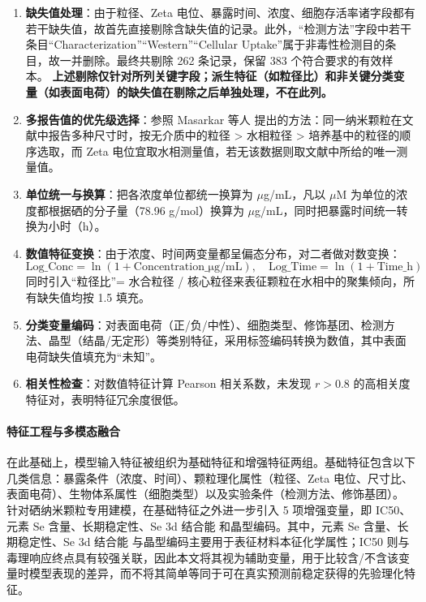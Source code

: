 \begin{enumerate}
  \item \textbf{缺失值处理}：由于粒径、Zeta 电位、暴露时间、浓度、细胞存活率诸字段都有若干缺失值，故首先直接剔除含缺失值的记录。此外，“检测方法”字段中若干条目“Characterization”“Western”“Cellular Uptake”属于非毒性检测目的条目，故一并删除。最终共剔除 262 条记录，保留 383 个符合要求的有效样本。
  \textbf{上述剔除仅针对所列关键字段；派生特征（如粒径比）和非关键分类变量（如表面电荷）的缺失值在剔除之后单独处理，不在此列。}

  \item \textbf{多报告值的优先级选择}：参照 Masarkar 等人 \cite{masarkar2024} 提出的方法：同一纳米颗粒在文献中报告多种尺寸时，按无介质中的粒径 > 水相粒径 > 培养基中的粒径的顺序选取，而 Zeta 电位宜取水相测量值，若无该数据则取文献中所给的唯一测量值。

  \item \textbf{单位统一与换算}：把各浓度单位都统一换算为 $\mu$g/mL，凡以 $\mu$M 为单位的浓度都根据硒的分子量（78.96 g/mol）换算为 $\mu$g/mL，同时把暴露时间统一转换为小时（h）。

  \item \textbf{数值特征变换}：由于浓度、时间两变量都呈偏态分布，对二者做对数变换：
        \[
          \text{Log\_Conc} = \ln(1 + \text{Concentration\_μg/mL}), \quad
          \text{Log\_Time} = \ln(1 + \text{Time\_h})
        \]
        同时引入“粒径比”= 水合粒径 / 核心粒径来表征颗粒在水相中的聚集倾向，所有缺失值均按 1.5 填充。

  \item \textbf{分类变量编码}：对表面电荷（正/负/中性）、细胞类型、修饰基团、检测方法、晶型（结晶/无定形）等类别特征，采用标签编码转换为数值，其中表面电荷缺失值填充为“未知”。

  \item \textbf{相关性检查}：对数值特征计算 Pearson 相关系数，未发现 $r > 0.8$ 的高相关度特征对，表明特征冗余度很低。
\end{enumerate}

\paragraph{特征工程与多模态融合}

在此基础上，模型输入特征被组织为基础特征和增强特征两组。基础特征包含以下几类信息：暴露条件（浓度、时间）、颗粒理化属性（粒径、Zeta 电位、尺寸比、表面电荷）、生物体系属性（细胞类型）以及实验条件（检测方法、修饰基团）。
针对硒纳米颗粒专用建模，在基础特征之外进一步引入 5 项增强变量，即 IC50、元素 Se 含量、长期稳定性、Se 3d 结合能 和晶型编码。其中，元素 Se 含量、长期稳定性、Se 3d 结合能 与晶型编码主要用于表征材料本征化学属性；IC50 则与毒理响应终点具有较强关联，因此本文将其视为辅助变量，用于比较含/不含该变量时模型表现的差异，而不将其简单等同于可在真实预测前稳定获得的先验理化特征。

